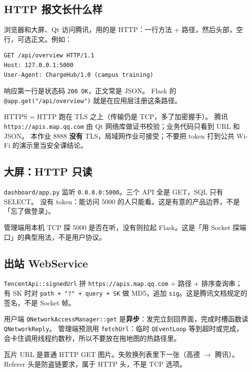 \documentclass[UTF8,a4paper,11pt]{ctexart}
\begin{document}
\subsection{HTTP 报文长什么样}

浏览器和大屏、Qt 访问腾讯，用的是 HTTP：一行方法 + 路径，然后头部，空行，可选正文。例如：

\begin{lstlisting}[language={}]
GET /api/overview HTTP/1.1
Host: 127.0.0.1:5000
User-Agent: ChargeHub/1.0 (campus training)

\end{lstlisting}

响应第一行是状态码 \texttt{200 OK}，正文常是 JSON。
Flask 的 \texttt{@app.get("/api/overview")} 就是在应用层注册这条路径。

HTTPS = HTTP 跑在 TLS 之上（传输仍是 TCP，多了加密握手）。
腾讯 \texttt{https://apis.map.qq.com} 由 Qt 网络库做证书校验；业务代码只看到 URL 和 JSON。
本作业 8888 \textbf{没有} TLS，局域网作业可接受；不要把 token 打到公共 Wi-Fi 的演示里当安全课结论。

\subsection{大屏：HTTP 只读}

\texttt{dashboard/app.py} 监听 \texttt{0.0.0.0:5000}。三个 API 全是 GET，SQL 只有 SELECT。
没有 token：能访问 5000 的人只能看。这是有意的产品边界，不是「忘了做登录」。

管理端用本机 TCP 探 5000 是否在听，没有则拉起 Flask。这是「用 Socket 探端口」的典型用法，不是用户协议。

\subsection{出站 WebService}

\texttt{TencentApi::signedUrl} 拼
\texttt{https://apis.map.qq.com} + 路径 + 排序查询串；有 SK 时对
\texttt{path + "?" + query + SK} 做 MD5，追加 \texttt{sig}。这是腾讯文档规定的签名，不是 Socket 帧。

用户端 \texttt{QNetworkAccessManager::get} 是\textbf{异步}：发完立刻回界面，完成时槽函数读 \texttt{QNetworkReply}。
管理端预测用 \texttt{fetchUrl}：临时 \texttt{QEventLoop} 等到超时或完成，会卡住调用线程约数秒，所以不要放在拖地图的热路径里。

瓦片 URL 是普通 HTTP GET 图片。失败换列表里下一张（高德 $\to$ 腾讯）。Referer 头是防盗链要求，属于 HTTP 头，不是 TCP 选项。
\end{document}
